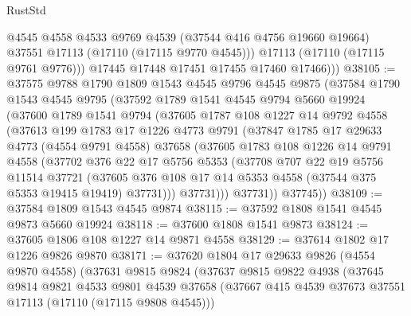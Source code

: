 \begin{lexlean}{RustStd}
\begin{coremodule}
              @4545
              @4558
              @4533
              @9769
              @4539
              (@37544 @416 @4756 @19660 @19664)
              @37551
              @17113
              (@17110 (@17115 @9770 @4545)))
            @17113
            (@17110 (@17115 @9761 @9776)))
          @17445
          @17448
          @17451
          @17455
          @17460
          @17466)))
@38105 := @37575
    @9788
    @1790
    @1809
    @1543
    @4545
    @9796
    @4545
    @9875
    (@37584
      @1790
      @1543
      @4545
      @9795
      (@37592
        @1789
        @1541
        @4545
        @9794
        @5660
        @19924
        (@37600
          @1789
          @1541
          @9794
          (@37605
            @1787
            @108
            @1227
            @14
            @9792
            @4558
            (@37613
              @199
              @1783
              @17
              @1226
              @4773
              @9791
              (@37847
                @1785
                @17
                @29633
                @4773
                (@4554 @9791 @4558)
                @37658
                (@37605
                  @1783
                  @108
                  @1226
                  @14
                  @9791
                  @4558
                  (@37702
                    @376
                    @22
                    @17
                    @5756
                    @5353
                    (@37708
                      @707
                      @22
                      @19
                      @5756
                      @11514
                      @37721
                      (@37605
                        @376
                        @108
                        @17
                        @14
                        @5353
                        @4558
                        (@37544 @375 @5353 @19415 @19419)
                        @37731)))
                  @37731)))
            @37731))
        @37745))
@38109 := @37584 @1809 @1543 @4545 @9874
@38115 := @37592 @1808 @1541 @4545 @9873 @5660 @19924
@38118 := @37600 @1808 @1541 @9873
@38124 := @37605 @1806 @108 @1227 @14 @9871 @4558
@38129 := @37614 @1802 @17 @1226 @9826 @9870
@38171 := @37620
    @1804
    @17
    @29633
    @9826
    (@4554 @9870 @4558)
    (@37631
      @9815
      @9824
      (@37637
        @9815
        @9822
        @4938
        (@37645
          @9814
          @9821
          @4533
          @9801
          @4539
          @37658
          (@37667 @415 @4539 @37673 @37551 @17113 (@17110 (@17115 @9808 @4545)))

\end{coremodule}
\end{lexlean}
